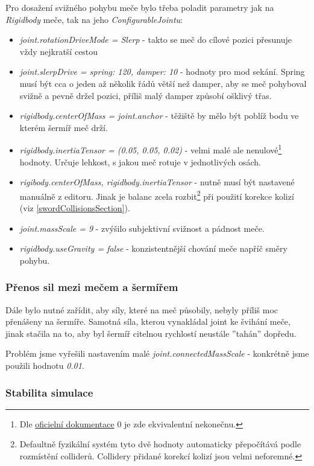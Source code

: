 Pro dosažení svižného pohybu meče bylo třeba poladit parametry jak na \textit{Rigidbody} meče, tak na jeho \textit{ConfigurableJointu}:
\begin{itemize}
  \item \textit{joint.rotationDriveMode = Slerp} - takto se meč do cílové pozici přesunuje vždy nejkratší cestou
  \item \textit{joint.slerpDrive = {spring: 120, damper: 10}} - hodnoty pro mod sekání. Spring musí být cca o jeden až několik řádů větší než damper, aby se meč pohyboval svižně a pevně držel pozici, příliš malý damper způsobí ošklivý třas.
  \item \textit{rigidbody.centerOfMass = joint.anchor} - těžiště by mělo být poblíž bodu ve kterém šermíř meč drží.
  \item \textit{rigidbody.inertiaTensor = (0.05, 0.05, 0.02)} - velmi malé ale nenulové\footnote{Dle \href{https://docs.unity3d.com/ScriptReference/Rigidbody-inertiaTensor.html}{oficielní dokumentace} 0 je zde ekvivalentní nekonečnu.} hodnoty. Určuje lehkost, s jakou meč rotuje v jednotlivých osách.
  \item \textit{rigibody.centerOfMass, rigidbody.inertiaTensor} - nutně musí být nastavené manuálně z editoru. Jinak je balanc zcela rozbit\footnote{Defaultně fyzikální systém tyto dvě hodnoty automaticky přepočítává podle rozmístění colliderů. Collidery přidané korekcí kolizí jsou velmi neforemné.} při použití korekce kolizí (viz \ref{swordCollisionsSection}).
  \item \textit{joint.massScale = 9} - zvýšilo subjektivní svižnost a pádnost meče.
  \item \textit{rigidbody.useGravity = false} - konzistentnější chování meče napříč směry pohybu.
\end{itemize}

\subsubsection*{Přenos sil mezi mečem a šermířem}

Dále bylo nutné zařídit, aby síly, které na meč působily, nebyly příliš moc přenášeny na šermíře. Samotná síla, kterou vynakládal joint ke švihání meče, jinak stačila na to, aby byl šermíř citelnou rychlostí neustále ''tahán'' dopředu.

Problém jsme vyřešili nastavením malé \textit{joint.connectedMassScale} - konkrétně jsme použili hodnotu \textit{0.01}.

\subsubsection*{Stabilita simulace}

